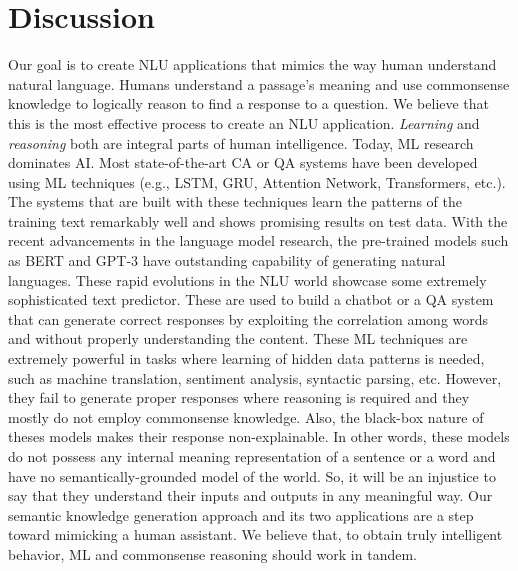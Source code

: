 \documentclass[letterpaper]{article}
\begin{document}
\section{Discussion}

Our goal is to create NLU applications that mimics the way human understand natural language. Humans understand a passage's meaning and use commonsense knowledge to logically reason to find a response to a question. We believe that this is the most effective process to create an NLU application. \textit{Learning} and \textit{reasoning} both are integral parts of human intelligence. Today, ML research dominates AI. Most state-of-the-art CA or QA systems have been developed using ML techniques (e.g., LSTM, GRU, Attention Network, Transformers, etc.). The systems that are built with these  techniques learn the patterns of the training text remarkably well and shows promising results on test data. With the recent advancements in the language model research, the pre-trained models such as BERT \cite{bert} and GPT-3 \cite{gpt3} have outstanding capability of generating natural languages. These rapid evolutions in the NLU world showcase some extremely sophisticated text predictor. These are used to build a chatbot or a QA system that can generate correct responses by exploiting the correlation among words and without properly understanding the content. These ML techniques are extremely powerful in tasks where learning of hidden data patterns is needed, such as machine translation, sentiment analysis, syntactic parsing, etc. However, they fail to generate proper responses where reasoning is required and they mostly do not employ commonsense knowledge. Also, the black-box nature of theses models makes their response non-explainable. In other words, these models do not possess any internal meaning representation of a sentence or a word and have no semantically-grounded model of the world. So, it will be an injustice to say that they understand their inputs and outputs in any meaningful way. Our semantic knowledge generation approach and its two applications are a step toward mimicking a human assistant. We believe that, to obtain truly intelligent behavior, ML and commonsense reasoning should work in tandem.
\end{document}
